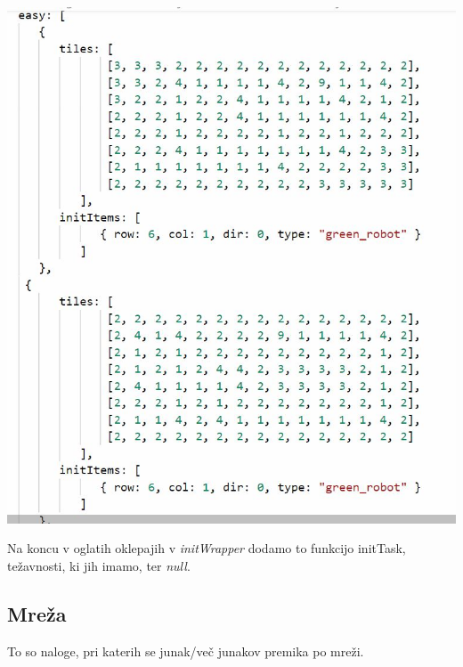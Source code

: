 \documentclass[11pt]{article} %
\begin{document}
\includegraphics[scale=0.4]{task_splosno_data_vec_testov}

Na koncu v oglatih oklepajih v \textit{initWrapper} dodamo to funkcijo initTask, težavnosti, ki jih imamo, ter \textit{null}.
\subsection{Mreža}

To so naloge, pri katerih se junak/več junakov premika po mreži. 
\end{document}
